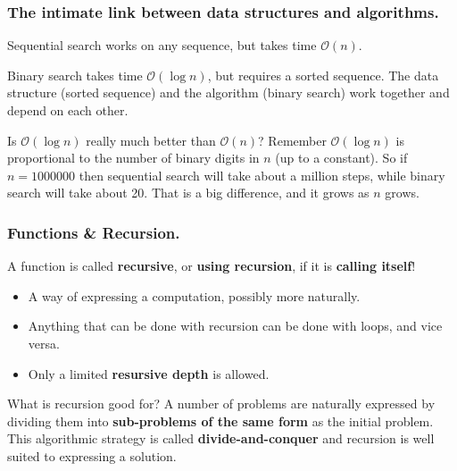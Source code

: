 \documentclass{beamer} %
\newcommand\emc[1]{\textcolor{midred}{\textbf{#1}}}
\begin{document}
\begin{frame}
\frametitle{The intimate link between data structures and algorithms.}

Sequential search works on any sequence, but takes time $\mathcal{O}(n)$.

\vspace{5mm}
Binary search takes time $\mathcal{O}(\log n)$, but requires a sorted sequence. The data structure (sorted sequence) and the algorithm (binary search) work together and depend on each other.

\vspace{5mm}
\begin{block}{Is $\mathcal{O}(\log n)$ really much better than $\mathcal{O}(n)$?}
Remember $\mathcal{O}(\log n)$ is proportional to the number of binary digits in $n$ (up to a constant). So if $n=1000000$ then sequential search will take about a million steps, while binary search will take about 20. That is a big difference, and it grows as $n$ grows.
\end{block}

\end{frame}


\begin{frame}
\frametitle{Functions \& Recursion.}

A function is called \emc{recursive}, or \emc{using recursion}, if it is \emc{calling itself}!
\begin{itemize}
	\item A way of expressing a computation, possibly more naturally.
	\item Anything that can be done with recursion can be done with loops, and vice versa.
	\item Only a limited \emc{resursive depth} is allowed.
\end{itemize}

\begin{block}{What is recursion good for?}
A number of problems are naturally expressed by dividing them into \emc{sub-problems of the same form} as the initial problem. This algorithmic strategy is called \emc{divide-and-conquer} and recursion is well suited to expressing a solution.
\end{block}

\end{frame}



\end{document}

